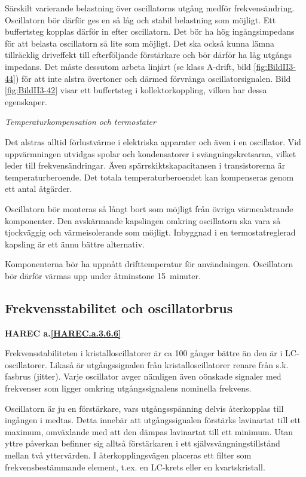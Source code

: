 Särskilt varierande belastning över oscillatorns utgång medför
frekvensändring. Oscillatorn bör därför ges en så låg och stabil
belastning som möjligt. Ett buffertsteg kopplas därför in efter
oscillatorn. Det bör ha hög ingångsimpedans för att belasta
oscillatorn så lite som möjligt. Det ska också kunna lämna
tillräcklig driveffekt till efterföljande förstärkare och bör därför
ha låg utgångs impedans. Det måste dessutom arbeta linjärt (se klass
A-drift, bild \ref{fig:BildII3-44}) för att inte alstra övertoner och därmed
förvränga oscillatorsignalen. Bild \ref{fig:BildII3-42} visar ett buffertsteg i
kollektorkoppling, vilken har dessa egenskaper.

\emph{Temperaturkompensation och termostater}

Det alstras alltid förlustvärme i elektriska apparater och även i en
oscillator. Vid uppvärmningen utvidgas spolar och kondensatorer i
svängningskretsarna, vilket leder till frekvensändringar. Även
spärrskiktskapacitansen i transistorerna är temperaturberoende. Det
totala temperaturberoendet kan kompenseras genom ett antal åtgärder.

Oscillatorn bör monteras så långt bort som möjligt från övriga
värmealstrande komponenter. Den avskärmande kapslingen omkring
oscillatorn ska vara så tjockväggig och värmeisolerande som
möjligt. Inbyggnad i en termostatreglerad kapsling är ett ännu bättre
alternativ.

Komponenterna bör ha uppnått drifttemperatur för användningen.
Oscillatorn bör därför värmas upp under åtminstone 15~minuter.

\subsection{Frekvensstabilitet och oscillatorbrus}
\textbf{HAREC a.\ref{HAREC.a.3.6.6}\label{myHAREC.a.3.6.6}}

Frekvensstabiliteten i kristalloscillatorer är ca 100 gånger bättre än
den är i LC-oscillatorer. Likaså är utgångssignalen från
kristalloscillatorer renare från s.k. fasbrus (jitter). Varje
oscillator avger nämligen även oönskade signaler med frekvenser som
ligger omkring utgångssignalens nominella frekvens.

Oscillatorn är ju en förstärkare, vars utgångsspänning delvis
återkopplas till ingången i medtas. Detta innebär att utgångssignalen
förstärks lavinartat till ett maximum, omväxlande med att den dämpas
lavinartat till ett minimum. Utan yttre påverkan befinner sig alltså
förstärkaren i ett självsvängningstillstånd mellan två yttervärden. I
återkopplingsvägen placeras ett filter som frekvensbestämmande
element, t.ex. en LC-krets eller en kvartskristall.

